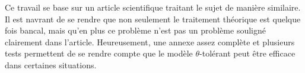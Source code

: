 \documentclass[letterpaper, 12pt]{report}
\theoremstyle{definition}
\begin{document}
Ce travail se base sur un article scientifique traitant le sujet de manière similaire. Il est navrant de se rendre que non seulement le traitement théorique est quelque fois bancal, mais qu'en plus ce problème n'est pas un problème souligné clairement dans l'article. Heureusement, une annexe assez complète et plusieurs tests permettent de se rendre compte que le modèle $\theta$-tolérant peut être efficace dans certaines situations.\\






\newpage
\appendix
\end{document}
